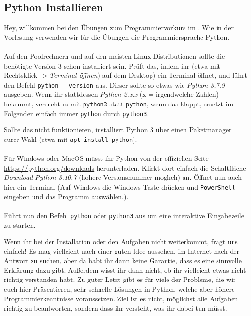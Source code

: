 \subsection{Python Installieren}
Hey, willkommen bei den Übungen zum Programmiervorkurs im \ptitle. Wie in der
Vorlesung verwenden wir für die Übungen die Programmiersprache Python. \\\\
%
Auf den Poolrechnern und auf den meisten Linux-Distributionen sollte die
benötigte Version 3 schon installiert sein. Prüft das, indem ihr (etwa mit
Rechtsklick -> \textit{Terminal öffnen}) auf dem Desktop) ein Terminal öffnet,
und führt den Befehl \texttt{python ----version} aus. Dieser sollte so etwas wie
\textit{Python 3.7.9} ausgeben. Wenn ihr stattdessen \textit{Python 2.x.x} (x = irgendwelche Zahlen) bekommt, versucht es mit \texttt{python3} statt \texttt{python}, wenn das klappt, ersetzt im Folgenden einfach immer \texttt{python} durch \texttt{python3}.

Sollte das nicht funktionieren, installiert Python 3 über einen Paketmanager
eurer Wahl (etwa mit \texttt{apt install python}). \\\\
%
Für Windows oder MacOS müsst ihr Python von der offiziellen Seite
\url{https://python.org/downloads} herunterladen. Klickt dort einfach die
Schaltfläche \textit{Download Python 3.10.7} (höhere Versionsnummer möglich) an.
Öffnet nun auch hier ein Terminal (Auf Windows die Windows-Taste drücken und \texttt{PowerShell} eingeben und das Programm auswählen.). \\\\
%
Führt nun den Befehl \texttt{python} oder \texttt{python3} aus um eine
interaktive Eingabezeile zu starten.

Wenn ihr bei der Installation oder den Aufgaben nicht weiterkommt, fragt uns einfach! Es mag vielleicht nach einer guten Idee aussehen, im Internet nach der Antwort zu suchen, aber da habt ihr dann keine Garantie, dass es eine sinnvolle Erklärung dazu gibt. Außerdem wisst ihr dann nicht, ob ihr vielleicht etwas nicht richtig verstanden habt. Zu guter Letzt gibt es für viele der Probleme, die wir euch hier Präsentieren, sehr schnelle Lösungen in Python, welche aber höhere Programmierkenntnisse voraussetzen. Ziel ist es nicht, möglichst alle Aufgaben richtig zu beantworten, sondern dass ihr versteht, was ihr dabei tun müsst.
